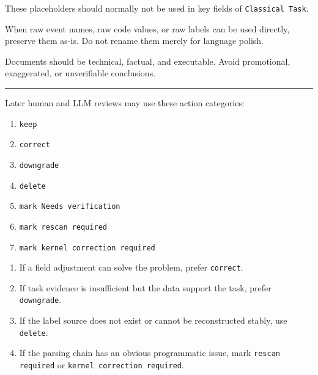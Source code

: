 \begin{tcolorbox}
\noindent These placeholders should normally not be used in key fields of \texttt{Classical Task}.\par\smallskip

\smallskip{}\par\smallskip

\noindent When raw event names, raw code values, or raw labels can be used directly, preserve them as-is. Do not rename them merely for language polish.\par\smallskip

\smallskip{}\par\smallskip

\noindent Documents should be technical, factual, and executable. Avoid promotional, exaggerated, or unverifiable conclusions.\par\smallskip

\medskip{}
\par\nopagebreak\noindent\rule{\linewidth}{0.4pt}\par\smallskip

\smallskip{}\par\smallskip

\noindent Later human and LLM reviews may use these action categories:\par\smallskip

\begin{enumerate}[leftmargin=1.5em,noitemsep,topsep=2pt]
\item \texttt{keep}
\item \texttt{correct}
\item \texttt{downgrade}
\item \texttt{delete}
\item \texttt{mark Needs verification}
\item \texttt{mark rescan required}
\item \texttt{mark kernel correction required}
\end{enumerate}

\smallskip{}\par\smallskip

\begin{enumerate}[leftmargin=1.5em,noitemsep,topsep=2pt]
\item If a field adjustment can solve the problem, prefer \texttt{correct}.
\item If task evidence is insufficient but the data support the task, prefer \texttt{downgrade}.
\item If the label source does not exist or cannot be reconstructed stably, use \texttt{delete}.
\item If the parsing chain has an obvious programmatic issue, mark \texttt{rescan required} or \texttt{kernel correction required}.
\end{enumerate}
\normalsize
\end{tcolorbox}